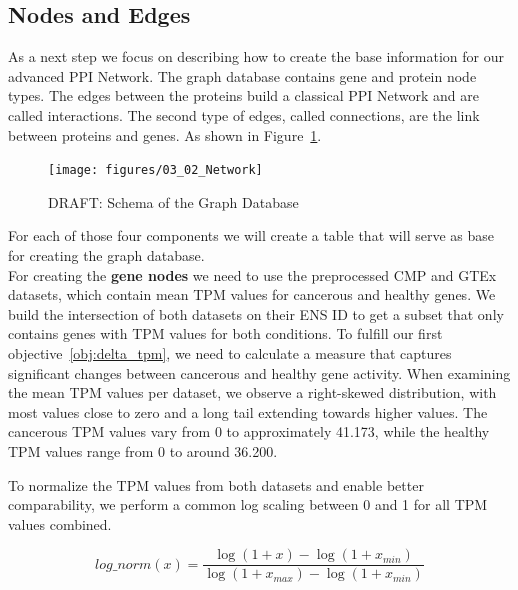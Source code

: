 \subsection{Nodes and Edges} \label{subsec:nodes_and_edges}

As a next step we focus on describing how to create the base information for our advanced PPI Network.
The graph database contains gene and protein node types.
The edges between the proteins build a classical PPI Network and are called interactions. %
The second type of edges, called connections, are the link between proteins and genes.
As shown in Figure~\ref{fig:03_02_Network}.

\begin{figure}[h]
\centering
\texttt{[image: figures/03\_02\_Network]}
\caption{DRAFT: Schema of the Graph Database}
\label{fig:03_02_Network}
\end{figure}

For each of those four components we will create a table that will serve as base for creating the graph database.\\

For creating the \textbf{gene nodes} we need to use the preprocessed CMP and GTEx datasets,
which contain mean TPM values for cancerous and healthy genes.
We build the intersection of both datasets on their ENS ID to get a subset that only contains genes with TPM values for both conditions.
To fulfill our first objective~\ref{obj:delta_tpm},
we need to calculate a measure that captures significant changes between cancerous and healthy gene activity.
When examining the mean TPM values per dataset, we observe a right-skewed distribution, with most values close to zero
and a long tail extending towards higher values.
The cancerous TPM values vary from 0 to approximately 41.173, while the healthy TPM values range from 0 to around 36.200.



To normalize the TPM values from both datasets and enable better comparability, we perform a common log scaling between 0 and 1 for all TPM values combined.

\begin{equation}
\label{eq:tpm_normalization}
log\_norm(x) = \frac{\log(1 + x) - \log(1 + x_{min})}{\log(1 + x_{max}) - \log(1 + x_{min})}
\end{equation}

